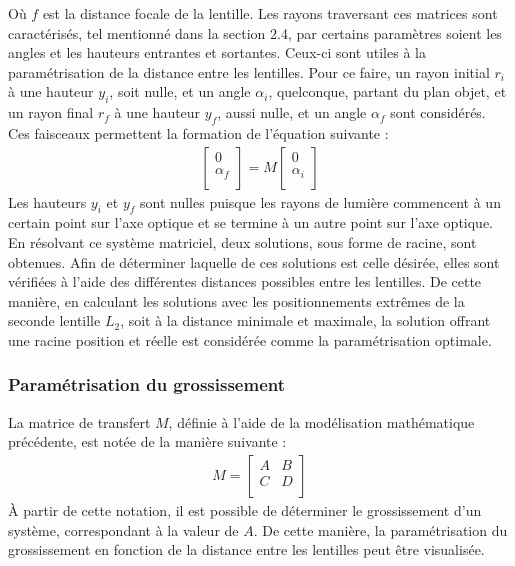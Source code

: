 \documentclass[11pt,letterpaper]{article}
\begin{document}
Où $f$ est la distance focale de la lentille. Les rayons traversant ces matrices sont caractérisés, tel mentionné dans la section 2.4, par certains paramètres soient les angles et les hauteurs entrantes et sortantes. Ceux-ci sont utiles à la paramétrisation de la distance entre les lentilles. Pour ce faire, un rayon initial $r_i$ à une hauteur $y_i$, soit nulle, et un angle $\alpha_i$, quelconque, partant du plan objet, et un rayon final $r_f$ à une hauteur $y_f$, aussi nulle, et un angle $\alpha_f$ sont considérés. Ces faisceaux permettent la formation de l'équation suivante :
\begin{gather}
  \begin{bmatrix}
    0 \\
    \alpha_f \\
  \end{bmatrix}=M
  \begin{bmatrix}
    0 \\
    \alpha_i \\
  \end{bmatrix}
\end{gather}
Les hauteurs $y_i$ et $y_f$ sont nulles puisque les rayons de lumière commencent à un certain point sur l'axe optique et se termine à un autre point sur l'axe optique. En résolvant ce système matriciel, deux solutions, sous forme de racine, sont obtenues. Afin de déterminer laquelle de ces solutions est celle désirée, elles sont vérifiées à l'aide des différentes distances possibles entre les lentilles. De cette manière, en calculant les solutions avec les positionnements extrêmes de la seconde lentille $L_2$, soit à la distance minimale et maximale, la solution offrant une racine position et réelle est considérée comme la paramétrisation optimale.

\subsubsection{Paramétrisation du grossissement}
La matrice de transfert $M$, définie à l'aide de la modélisation mathématique précédente, est notée de la manière suivante :
\begin{gather}
  M=
  \begin{bmatrix}
    A & B \\
    C & D \\
  \end{bmatrix}
\end{gather}
À partir de cette notation, il est possible de déterminer le grossissement d'un système, correspondant à la valeur de $A$. De cette manière, la paramétrisation du grossissement en fonction de la distance entre les lentilles peut être visualisée.
\end{document}

